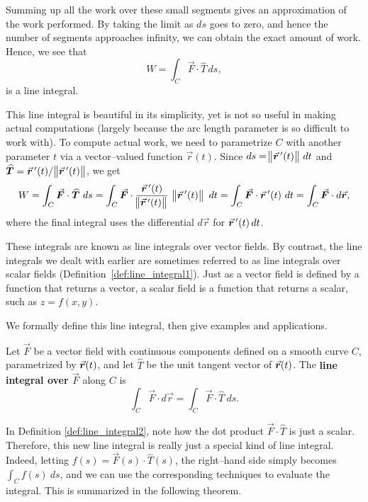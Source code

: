 Summing up all the work over these small segments gives an approximation of the work performed. By taking the limit as $ds$ goes to zero, and hence the number of segments approaches infinity, we can obtain the exact amount of work. Hence, we see that 
$$W = \int_C \vec F\cdot \widehat T\,ds,$$
is a line integral.

This line integral is beautiful in its simplicity, yet is not so useful in making actual computations (largely because the arc length parameter is so difficult to work with). To compute actual work, we need to parametrize $C$ with another parameter $t$ via a vector--valued function $\vec r(t)$. Since $ds = \norm{\vrp(t)}\,dt$ and $\widehat T = \vrp(t)/\norm{\vrp(t)}$, we get
\begin{equation}
W = \int_C \vec F\cdot\widehat T\ ds = \int_C \vec F\cdot \frac{\vrp(t)}{\norm{\vrp(t)}}\ \norm{\vrp(t)}\ dt = \int_C\vec F\cdot \vrp(t)\ dt = \int_C \vec F\cdot d\vec r,
\label{eq:line_integral}\end{equation}
where the final integral uses the differential $d\vec r$ for $\vrp(t)\,dt$.

These integrals are known as line integrals over vector fields. By contrast, the line integrals we dealt with earlier are sometimes referred to as line integrals over scalar fields (Definition~\ref{def:line_integral1}). Just as a vector field is defined by a function that returns a vector, a scalar field is a function that returns a scalar, such as $z = f(x,y)$.

We formally define this line integral, then give examples and applications.

\begin{definition}\label{def:line_integral2}
Let $\vec F$ be a vector field with continuous components defined on a smooth curve $C$, parametrized by $\vrt$, and let $\widehat T$ be the unit tangent vector of $\vrt$. The \textbf{line integral over $\vec F$} along $C$ is
$$\int_C \vec F\cdot d\vec r = \int_C \vec F\cdot\widehat T\ ds.$$
\end{definition}

In Definition \ref{def:line_integral2}, note how the dot product $\vec F \cdot \widehat T$ is just a scalar. 
Therefore, this new line integral is really just a special kind of line integral. Indeed, letting $f(s) = \vec F(s)\cdot \widehat T(s)$, the right--hand side simply becomes $\int_C f(s)\ ds$, and we can use the corresponding techniques to evaluate the integral. This is summarized in the following theorem. 

